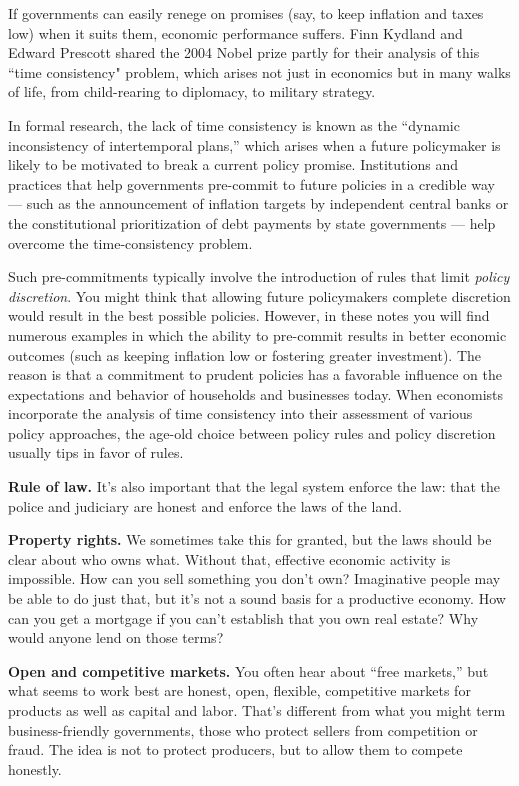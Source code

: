 If governments can easily renege on promises (say, to keep
inflation and taxes low) when it suits them,
economic performance suffers. Finn Kydland 
 and Edward Prescott 
shared the 2004 Nobel prize partly for their analysis of this ``time
consistency" problem, which arises not just in economics
but in many walks of life, from child-rearing to diplomacy,
to military strategy.

In formal research, the lack of time consistency is known as the
``dynamic inconsistency of intertemporal plans,'' which arises when a
future policymaker is likely to be motivated to break a current policy
promise. Institutions and practices that help governments pre-commit
to future policies in a credible way --- such as the announcement of inflation targets
by independent central banks  or the constitutional prioritization
of debt payments by state governments --- help overcome
the time-consistency problem.

Such pre-commitments typically involve the introduction of
rules that limit \emph{policy discretion}. You might think that allowing
future policymakers complete discretion would result in the best possible
policies. However, in these notes you will find numerous examples in which the
ability to pre-commit results in better economic outcomes
(such as keeping inflation low or fostering greater investment).
The reason is that a commitment to prudent policies has a favorable influence
on the expectations and behavior of households and businesses today. When
economists incorporate the analysis of time consistency into
their assessment of various policy approaches, the age-old choice between
policy rules and policy discretion usually tips in favor of rules.

\textbf{Rule of law.}
It's also important that the legal system enforce the law:
that the police and judiciary are honest and
enforce the laws of the land.

\textbf{Property rights. 
}
We sometimes take this for granted,
but the laws should be clear about who owns what.
Without that, effective economic activity is impossible.
How can you sell something you don't own?
Imaginative people may be able to do just that,
but it's not a sound basis for a productive economy.
How can you get a mortgage if you can't establish
that you own real estate?
Why would anyone lend on those terms?

\textbf{Open and competitive markets. }
You often hear about ``free markets,''
but what seems to work best are honest, open, flexible, competitive markets 
for products as well as capital and labor.
That's different from what you might term business-friendly governments,
those who protect sellers from competition or fraud.
The idea is not to protect producers,
but to allow them to compete honestly.

